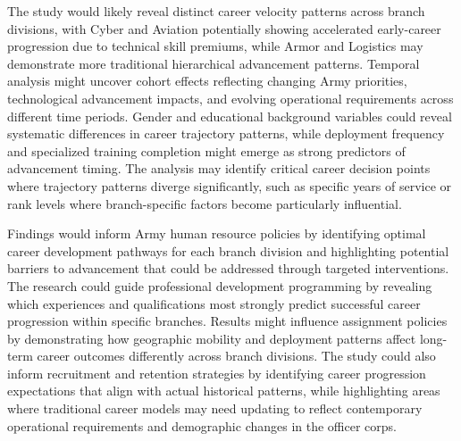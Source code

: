 \documentclass[../main.tex]{subfiles}
\begin{document}

The study would likely reveal distinct career velocity patterns across branch divisions, with Cyber and Aviation potentially showing accelerated early-career progression due to technical skill premiums, while Armor and Logistics may demonstrate more traditional hierarchical advancement patterns. Temporal analysis might uncover cohort effects reflecting changing Army priorities, technological advancement impacts, and evolving operational requirements across different time periods. Gender and educational background variables could reveal systematic differences in career trajectory patterns, while deployment frequency and specialized training completion might emerge as strong predictors of advancement timing. The analysis may identify critical career decision points where trajectory patterns diverge significantly, such as specific years of service or rank levels where branch-specific factors become particularly influential.


Findings would inform Army human resource policies by identifying optimal career development pathways for each branch division and highlighting potential barriers to advancement that could be addressed through targeted interventions. The research could guide professional development programming by revealing which experiences and qualifications most strongly predict successful career progression within specific branches. Results might influence assignment policies by demonstrating how geographic mobility and deployment patterns affect long-term career outcomes differently across branch divisions. The study could also inform recruitment and retention strategies by identifying career progression expectations that align with actual historical patterns, while highlighting areas where traditional career models may need updating to reflect contemporary operational requirements and demographic changes in the officer corps.
\end{document}
